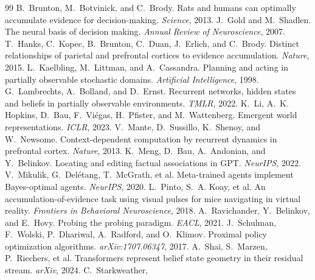 \documentclass[11pt]{article}
\begin{document}
\begin{thebibliography}{99}\small
{} B.~Brunton, M.~Botvinick, and
C.~Brody. Rats and humans can optimally accumulate evidence for decision-making.
\emph{Science}, 2013.
 J.~Gold and M.~Shadlen. The neural
basis of decision making. \emph{Annual Review of Neuroscience}, 2007.
 T.~Hanks, C.~Kopec, B.~Brunton,
C.~Duan, J.~Erlich, and C.~Brody. Distinct relationships of parietal and prefrontal
cortices to evidence accumulation. \emph{Nature}, 2015.
 L.~Kaelbling, M.~Littman,
and A.~Cassandra. Planning and acting in partially observable stochastic domains.
\emph{Artificial Intelligence}, 1998.
 G.~Lambrechts,
A.~Bolland, and D.~Ernst. Recurrent networks, hidden states and beliefs in
partially observable environments. \emph{TMLR}, 2022.
 K.~Li, A.~K. Hopkins, D.~Bau, F.~Vi\'egas,
H.~Pfister, and M.~Wattenberg. Emergent world representations. \emph{ICLR}, 2023.
 V.~Mante, D.~Sussillo, K.~Shenoy,
and W.~Newsome. Context-dependent computation by recurrent dynamics in prefrontal
cortex. \emph{Nature}, 2013.
 K.~Meng, D.~Bau, A.~Andonian, and
Y.~Belinkov. Locating and editing factual associations in GPT. \emph{NeurIPS}, 2022.
 V.~Mikulik, G.~Del\'etang,
T.~McGrath, et al. Meta-trained agents implement Bayes-optimal agents.
\emph{NeurIPS}, 2020.
 L.~Pinto, S.~A. Koay, et al. An
accumulation-of-evidence task using visual pulses for mice navigating in virtual
reality. \emph{Frontiers in Behavioral Neuroscience}, 2018.
 A.~Ravichander,
Y.~Belinkov, and E.~Hovy. Probing the probing paradigm. \emph{EACL}, 2021.
 J.~Schulman, F.~Wolski,
P.~Dhariwal, A.~Radford, and O.~Klimov. Proximal policy optimization algorithms.
\emph{arXiv:1707.06347}, 2017.
 A.~Shai, S.~Marzen, P.~Riechers,
et al. Transformers represent belief state geometry in their residual stream.
\emph{arXiv}, 2024.
 C.~Starkweather,

\end{thebibliography}
\end{document}
